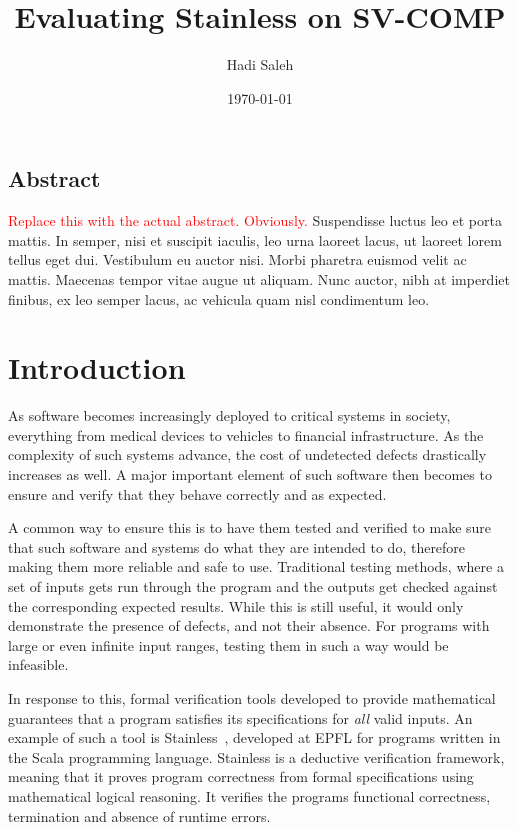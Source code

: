 \documentclass[11pt,titlepage,openright]{book}
\newcommand{\RED}[1]{\textcolor{red}{#1}}
\begin{document}
\frontmatter
\title{Evaluating Stainless on SV-COMP}
\author{Hadi Saleh}
\date{\today}

\maketitle

\vspace*{3cm}
\section*{Abstract}

\RED{Replace this with the actual abstract. Obviously.}
Suspendisse luctus leo et porta mattis. In semper, nisi et
suscipit iaculis, leo urna laoreet lacus, ut laoreet lorem tellus
eget dui. Vestibulum eu auctor nisi. Morbi pharetra euismod velit
ac mattis. Maecenas tempor vitae augue ut aliquam. Nunc auctor,
nibh at imperdiet finibus, ex leo semper lacus, ac vehicula quam
nisl condimentum leo.

\tableofcontents
\listoffigures
\listoftables

\mainmatter

\chapter{Introduction}
As software becomes increasingly deployed to critical systems in society,
everything from medical devices to vehicles to financial infrastructure. 
As the complexity of such systems advance, 
the cost of undetected defects drastically increases as well.
A major important element of such software then becomes to ensure and
verify that they behave correctly and as expected.  

A common way to ensure this is to have them tested and verified 
to make sure that such software and systems do what they are 
intended to do, therefore making them more reliable and safe to use. 
Traditional testing methods, where a set of inputs gets run through
the program and the outputs get checked against the corresponding 
expected results. While this is still useful, 
it would only demonstrate the presence of defects, 
and not their absence. For programs with large or even infinite 
input ranges, testing them in such a way would be infeasible.

In response to this, formal verification tools
developed to provide mathematical guarantees that a program satisfies
its specifications for \emph{all} valid inputs. An example of such a 
tool is Stainless~\cite{StainlessOriginal}, developed at EPFL for programs written
in the Scala programming language. Stainless is
a deductive verification framework, meaning that it proves 
program correctness from formal specifications using mathematical
logical reasoning. It verifies the programs functional correctness,
termination and absence of runtime errors. 
\end{document}

